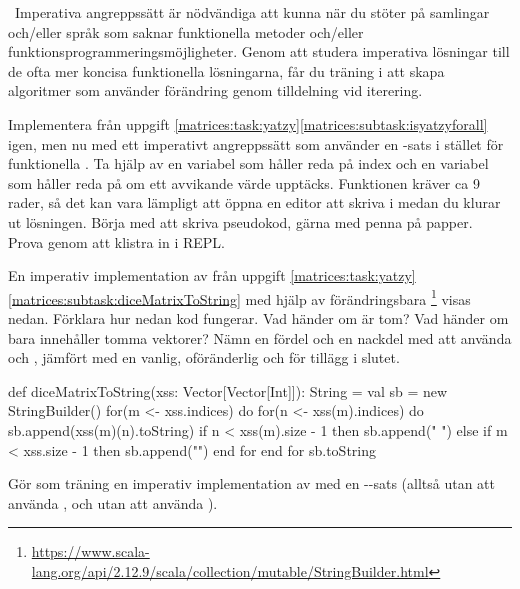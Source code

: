 \QUESTEND


\clearpage

\ExtraTasks %



\QUESTBEGIN

\Task  \what~Imperativa angreppssätt är nödvändiga att kunna när du stöter på samlingar och/eller språk som saknar funktionella metoder och/eller funktionsprogrammeringsmöjligheter. Genom att studera imperativa lösningar till de ofta mer koncisa funktionella lösningarna, får du träning i att skapa algoritmer som använder förändring genom tilldelning vid iterering.

\Subtask Implementera  från uppgift \ref{matrices:task:yatzy}\ref{matrices:subtask:isyatzyforall} igen, men nu med ett imperativt angreppssätt som använder en -sats i stället för funktionella . Ta hjälp av en variabel  som håller reda på index och en variabel  som håller reda på om ett avvikande värde upptäcks. Funktionen kräver ca 9 rader, så det kan vara lämpligt att öppna en editor att skriva i medan du klurar ut lösningen. Börja med att skriva pseudokod, gärna med penna på papper. Prova genom att klistra in i REPL.

\Subtask En imperativ implementation av  från uppgift \ref{matrices:task:yatzy}\ref{matrices:subtask:diceMatrixToString} med hjälp av förändringsbara  \footnote{\url{https://www.scala-lang.org/api/2.12.9/scala/collection/mutable/StringBuilder.html}} visas nedan. Förklara hur nedan kod fungerar. Vad händer om  är tom? Vad händer om  bara innehåller tomma vektorer? Nämn en fördel och en nackdel med att använda  och , jämfört med en vanlig, oföränderlig  och \code{+} för tillägg i slutet.
\begin{Code}
def diceMatrixToString(xss: Vector[Vector[Int]]): String = 
  val sb = new StringBuilder()
  for(m <- xss.indices) do
    for(n <- xss(m).indices) do
      sb.append(xss(m)(n).toString)
      if n < xss(m).size - 1 then sb.append(" ")
      else if m < xss.size - 1 then sb.append("\n")
    end for
  end for
  sb.toString
\end{Code}

\Subtask Gör som träning en imperativ implementation av  med en --sats (alltså utan att använda , och utan att använda ).



